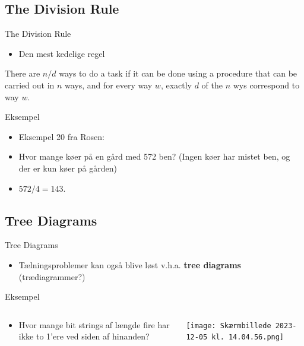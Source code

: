 \documentclass{beamer}
\begin{document}
\subsection{The Division Rule}
\begin{frame}{The Division Rule}

\begin{itemize}
    \item Den mest kedelige regel
\end{itemize}
\begin{theorem}
   There are $n/d$ ways to do a task if it can be done using a procedure that can be carried out in $n$ ways, and for every way $w$, exactly $d$ of the $n$ wys correspond to way $w$. 
\end{theorem}
\end{frame}

\begin{frame}{Eksempel}
   \begin{itemize}
       \item<1-> Eksempel 20 fra Rosen:
       \item<1-> Hvor mange køer på en gård med 572 ben? (Ingen køer har mistet ben, og der er kun køer på gården)
        \item<2-> $572/4 = 143$.
   \end{itemize} 
\end{frame}

\subsection{Tree Diagrams}
\begin{frame}{Tree Diagrams}
    \begin{itemize}
        \item Tælningsproblemer kan også blive løst v.h.a. \textbf{tree diagrams} (trædiagrammer?)
    \end{itemize}
\end{frame}

\begin{frame}{Eksempel}
\begin{columns}
   \begin{column}{0.5\textwidth}
   \begin{itemize}
       \item Hvor mange bit strings af længde fire har ikke to 1'ere ved siden af hinanden? 
   \end{itemize} 
   \end{column} 
   \begin{column}{0.5 \textwidth}
        \pause 
        \texttt{[image: Skærmbillede 2023-12-05 kl. 14.04.56.png]}
   \end{column}
\end{columns}
\end{frame}
\end{document}

